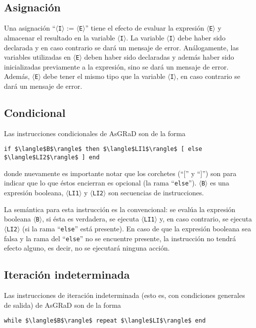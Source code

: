 \documentclass[letterpaper,11pt]{article}
\newcommand{\asgrad}{AsGRaD\xspace}
\newcommand{\general}[1]{$\langle$\texttt{#1}$\rangle$}
\begin{document}
\subsection{Asignación}

Una asignación ``\general{I} := \general{E}'' tiene el efecto de evaluar la expresión \general{E} y almacenar el resultado en la variable \general{I}. La variable \general{I} debe haber sido declarada y en caso contrario se dará un mensaje de error. Análogamente, las variables utilizadas en \general{E} deben haber sido declaradas y además haber sido inicializadas previamente a la expresión, sino se dará un mensaje de error. Además, \general{E} debe tener el mismo tipo que la variable \general{I}, en caso contrario se dará un mensaje de error.

\subsection{Condicional}

Las instrucciones condicionales de \asgrad son de la forma

\begin{lstlisting}[mathescape=true]
    if $\langle$B$\rangle$ then $\langle$LI1$\rangle$ [ else $\langle$LI2$\rangle$ ] end    
\end{lstlisting}

\noindent
donde nuevamente es importante notar que los corchetes (``['' y ``]'') son para indicar que lo que éstos encierran es opcional (la rama ``\texttt{else}''). \general{B} es una expresión booleana, \general{LI1} y \general{LI2} son secuencias de instrucciones.

La semántica para esta instrucción es la convencional: se evalúa la expresión booleana \general{B}, si ésta es verdadera, se ejecuta \general{LI1} y, en caso contrario, se ejecuta \general{LI2} (si la rama ``\texttt{else}'' está presente). En caso de que la expresión booleana sea falsa y la rama del ``\texttt{else}'' no se encuentre presente, la instrucción no tendrá efecto alguno, es decir, no se ejecutará ninguna acción.

\subsection{Iteración indeterminada}

Las instrucciones de iteración indeterminada (esto es, con condiciones generales de salida) de \asgrad son de la forma

\begin{lstlisting}[mathescape=true]
    while $\langle$B$\rangle$ repeat $\langle$LI$\rangle$ end
\end{lstlisting}
\end{document}
